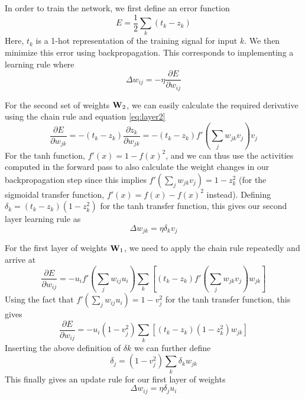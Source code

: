 \documentclass{article}
\begin{document}
In order to train the network, we first define an error function
\begin{equation}
E = \dfrac{1}{2} \sum_k{(t_k - z_k)}
\end{equation}
Here, $t_k$ is a 1-hot representation of the training signal for input $k$. We then minimize this error using backpropagation. This corresponds to implementing a learning rule where 
\begin{equation}
\Delta w_{ij} = - \eta \dfrac{\partial E}{\partial w_{ij}}
\end{equation}

For the second set of weights ${\bf W}_2$, we can easily calculate the required derivative using the chain rule and equation \ref{eq:layer2}
\begin{equation}
\dfrac{\partial E}{\partial w_{jk}} = -(t_k - z_k)\dfrac{\partial z_k}{\partial w_{jk}} = -(t_k - z_k)f'(\sum_j{w_{jk}v_j})v_j
\end{equation}
For the tanh function, $f'(x) = 1- f(x)^2$, and we can thus use the activities computed in the forward pass to also calculate the weight changes in our backpropagation step since this implies $f'(\sum_j{w_{jk}v_j}) = 1 - z_k^2$ (for the sigmoidal transfer function, $f'(x) = f(x)-f(x)^2$ instead).
Defining $\delta_{k} = (t_k - z_k)(1-z_k ^ 2)$ for the tanh transfer function, this gives our second layer learning rule as
\begin{equation}
\Delta w_{jk} = \eta \delta_{k} v_j
\end{equation}

For the first layer of weights ${\bf W}_1$, we need to apply the chain rule repeatedly and arrive at
\begin{equation}
\dfrac{\partial E}{\partial w_{ij}} = - u_i f'(\sum_j{w_{ij}u_i}) \sum_k{[(t_k - z_k)f'(\sum_j{w_{jk}v_j})w_{jk}]}
\end{equation}
Using the fact that $f'(\sum_j{w_{ij}u_i}) = 1 - v_j^2$ for the tanh transfer function, this gives
\begin{equation}
\dfrac{\partial E}{\partial w_{ij}} = - u_i (1 - v_j^2) \sum_k{[(t_k - z_k)(1 - z_k^2)w_{jk}]}
\end{equation}
Inserting the above definition of $\delta k$ we can further define
\begin{equation}
\delta_j = (1- v_j^2) \sum_k{\delta_k w_{jk}}
\end{equation}
This finally gives an update rule for our first layer of weights
\begin{equation}
\Delta w_{ij} = \eta \delta_{j} u_i
\end{equation}
\end{document}
